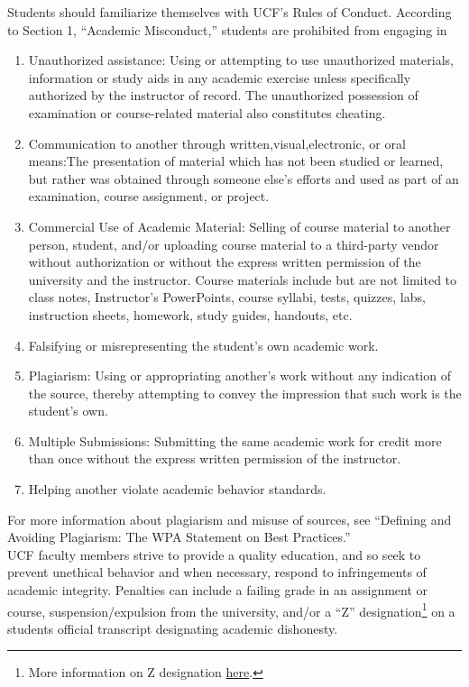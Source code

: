 \documentclass[11pt]{paper}
\begin{document}
Students should familiarize themselves with UCF’s Rules of Conduct. According to Section 1, ``Academic Misconduct,'' students are prohibited from engaging in
\begin{enumerate}
\item Unauthorized assistance: Using or attempting to use unauthorized materials, information or study aids in any academic exercise unless specifically authorized by the instructor of record. The unauthorized possession of examination or course-related material also constitutes cheating.
\item Communication to another through written,visual,electronic, or oral means:The presentation of material which has not been studied or learned, but rather was obtained through someone else’s efforts and used as part of an examination, course assignment, or project.
\item Commercial Use of Academic Material: Selling of course material to another person, student, and/or uploading course material to a third-party vendor without authorization or without the express written permission of the university and the instructor. Course materials include but are not limited to class notes, Instructor’s PowerPoints, course syllabi, tests, quizzes, labs, instruction sheets, homework, study guides, handouts, etc.
\item Falsifying or misrepresenting the student’s own academic work.
\item Plagiarism: Using or appropriating another’s work without any indication of the source, thereby attempting to convey the impression that such work is the student’s own.
\item Multiple Submissions: Submitting the same academic work for credit more than once without the express written permission of the instructor.
\item Helping another violate academic behavior standards.
\end{enumerate}
For more information about plagiarism and misuse of sources, see ``Defining and Avoiding Plagiarism: The WPA Statement on Best Practices.''\\


UCF faculty members strive to provide a quality education, and so seek to prevent unethical behavior and when necessary, respond to infringements of academic integrity. Penalties can include a failing grade in an assignment or course, suspension/expulsion from the university, and/or a ``Z'' designation\footnote{More information on Z designation \href{https://goldenrule.sdes.ucf.edu/zgrade}{here}.} on a students official transcript designating academic dishonesty. 
\end{document}
